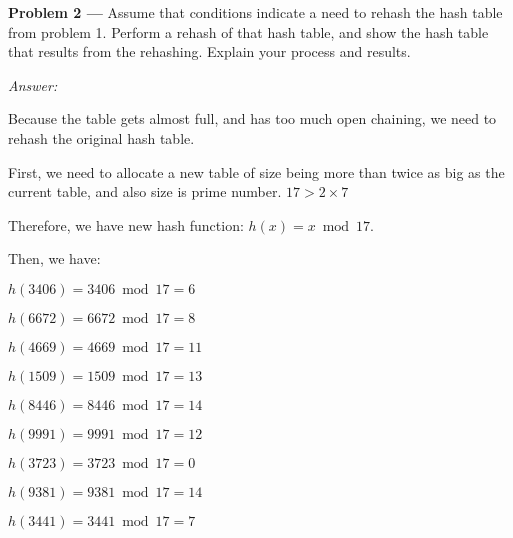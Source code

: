 \documentclass[11pt]{article}
\newcommand{\problem}[1]{\vspace*{2ex}\textbf{Problem #1 ---} }
\newcommand{\answer}{\emph{Answer: } }
\begin{document}
\newpage

\problem{2} Assume that conditions indicate a need to rehash 
the hash table from problem 1. Perform a rehash of that hash table, 
and show the hash table that results from the rehashing. 
Explain your process and results.

\answer{}

Because the table gets almost full, and has too much open chaining, 
we need to rehash the original hash table. 

First, we need to allocate a new table of size being more than twice
as big as the current table, and also size is prime number. 
$17 > 2 \times 7$

Therefore, we have new hash function: $h(x) = x \bmod 17$.

Then, we have:
\begin{center}
 $h(3406) = 3406 \bmod 17 = 6$

 $h(6672) = 6672 \bmod 17 = 8$

 $h(4669) = 4669 \bmod 17 = 11$

 $h(1509) = 1509 \bmod 17 = 13$

 $h(8446) = 8446 \bmod 17 = 14$

 $h(9991) = 9991 \bmod 17 = 12$

 $h(3723) = 3723 \bmod 17 = 0$

 $h(9381) = 9381 \bmod 17 = 14$

 $h(3441) = 3441 \bmod 17 = 7$
\end{center}
\end{document}
